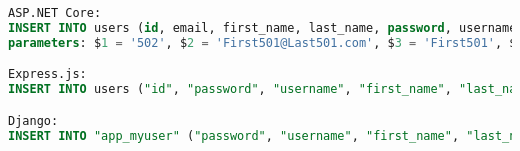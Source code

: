 \begin{lstlisting}[language=SQL,caption={\acrshort{sql} commands for creating objects},breaklines=true,label={lst:sqlPost}]
ASP.NET Core:
INSERT INTO users (id, email, first_name, last_name, password, username) VALUES ($1, $2, $3, $4, $5, $6)
parameters: $1 = '502', $2 = 'First501@Last501.com', $3 = 'First501', $4 = 'Last501', $5 = 'Pass501!', $6 = 'First501Last501'

Express.js:
INSERT INTO users ("id", "password", "username", "first_name", "last_name", "email") VALUES(502, 'Pass501!', 'First501Last501', 'First501', 'Last501', 'First501@Last501.com') RETURNING *

Django:
INSERT INTO "app_myuser" ("password", "username", "first_name", "last_name", "email") VALUES ('Pass501!', 'First501Last501', 'First501', 'Last501', 'First501@Last501.com') RETURNING "app_myuser"."id"
\end{lstlisting}
